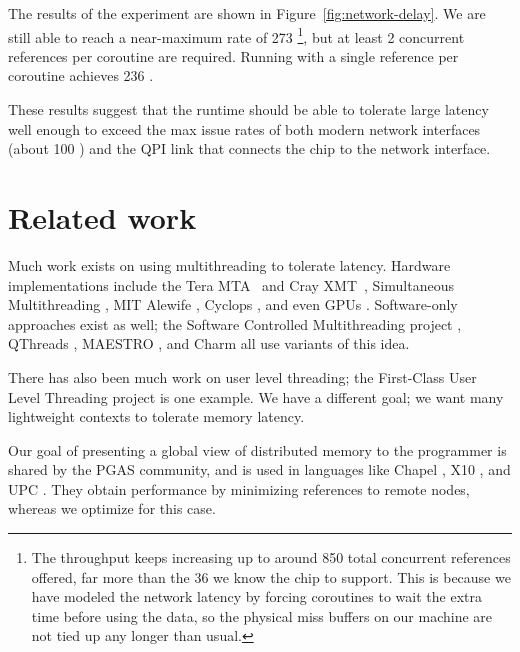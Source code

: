 \documentclass[10pt,nocopyrightspace,preprint]{sigplanconf}
\begin{document}
The results of the experiment are shown in
Figure~\ref{fig:network-delay}. We are still able to reach a
near-maximum rate of 273 \mrps\footnote{The throughput keeps increasing up to around 850 total concurrent references offered, far more than the 36 we know the chip to support. This is because we have modeled the network latency by forcing coroutines to wait the extra time before using the data, so the physical miss buffers on our machine are not tied up any longer than usual.}, but at least 2
concurrent references per coroutine are required. Running with a single
reference per coroutine achieves 236 \mrps. 

These results suggest that the runtime should be able to tolerate large latency well enough to exceed the max issue rates of both modern network interfaces (about 100 \mrps) \cite{mellanox:press} and the QPI link that connects the chip to the network interface.




\section{Related work}
\label{sec:related}


Much work exists on using multithreading to tolerate latency. Hardware
implementations include the Tera MTA~\cite{tera} and Cray
XMT~\cite{feo-xmt}, Simultaneous Multithreading \cite{tullsen-smt},
MIT Alewife \cite{agarwal-alewife}, Cyclops \cite{almasi-cyclops}, and
even GPUs \cite{gpus}. Software-only approaches exist as well; the
Software Controlled Multithreading project \cite{mowry-scm}, QThreads
\cite{qthreads}, MAESTRO \cite{maestro}, and Charm \cite{charm} all
use variants of this idea.

There has also been much work on user level threading; the First-Class
User Level Threading project \cite{ult} is one example. We have a
different goal; we want many lightweight contexts to tolerate memory
latency.

Our goal of presenting a global view of distributed memory to the
programmer is shared by the PGAS community, and is used in languages
like Chapel \cite{chapel}, X10 \cite{X10}, and UPC \cite{upc}. They
obtain performance by minimizing references to remote nodes, whereas we
optimize for this case.
\end{document}
